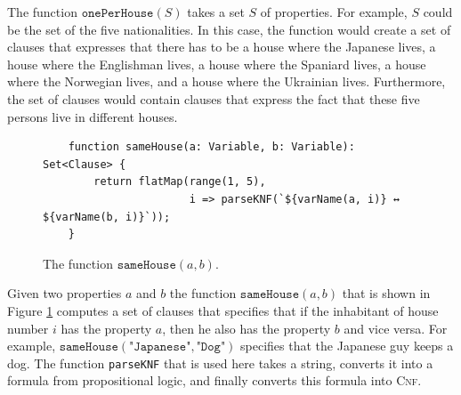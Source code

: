 The function $\texttt{onePerHouse}(S)$ takes a set $S$ of properties.  For
example, $S$ could be the set of the five nationalities.
In this case, the function would create a set of clauses that expresses that
there has to be a house where the Japanese lives, a house where the Englishman
lives, a house where the Spaniard lives, a house where the Norwegian lives, and
a house where the Ukrainian lives.  Furthermore, the set of clauses would contain
clauses that express the fact that these five persons live in different houses.


\begin{figure}[!ht]
\centering
\begin{verbatim}
    function sameHouse(a: Variable, b: Variable): Set<Clause> {
        return flatMap(range(1, 5),
                       i => parseKNF(`${varName(a, i)} ↔ ${varName(b, i)}`));
    }
\end{verbatim}
\vspace*{-0.3cm}
\caption{The function $\texttt{sameHouse}(a, b)$.}
\label{fig:sameHouse}
\end{figure}

Given two properties $a$ and $b$ the function $\texttt{sameHouse}(a, b)$ that is
shown in Figure \ref{fig:sameHouse} computes
a set of clauses that specifies that if the inhabitant of house number $i$ has
the property $a$, then he also has the property $b$ and vice versa.  For
example, $\texttt{sameHouse}(\texttt{"Japanese"}, \texttt{"Dog"})$ specifies
that the Japanese guy keeps a dog.  The function \texttt{parseKNF} that is used here takes a string, converts
it into a formula from propositional logic, and finally converts this formula into \textsc{Cnf}.


